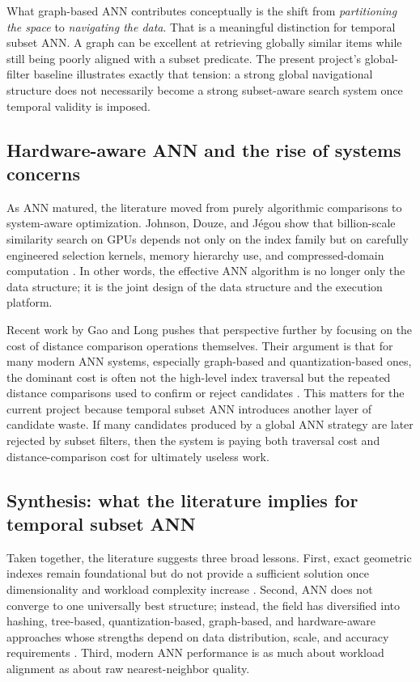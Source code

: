 \documentclass[sigconf,nonacm]{acmart}
\begin{document}
What graph-based ANN contributes conceptually is the shift from \emph{partitioning the space} to \emph{navigating the data}. That is a meaningful distinction for temporal subset ANN. A graph can be excellent at retrieving globally similar items while still being poorly aligned with a subset predicate. The present project's global-filter baseline illustrates exactly that tension: a strong global navigational structure does not necessarily become a strong subset-aware search system once temporal validity is imposed.

\subsection{Hardware-aware ANN and the rise of systems concerns}

As ANN matured, the literature moved from purely algorithmic comparisons to system-aware optimization. Johnson, Douze, and J\'egou show that billion-scale similarity search on GPUs depends not only on the index family but on carefully engineered selection kernels, memory hierarchy use, and compressed-domain computation \cite{johnson2021}. In other words, the effective ANN algorithm is no longer only the data structure; it is the joint design of the data structure and the execution platform.

Recent work by Gao and Long pushes that perspective further by focusing on the cost of distance comparison operations themselves. Their argument is that for many modern ANN systems, especially graph-based and quantization-based ones, the dominant cost is often not the high-level index traversal but the repeated distance comparisons used to confirm or reject candidates \cite{gao2023}. This matters for the current project because temporal subset ANN introduces another layer of candidate waste. If many candidates produced by a global ANN strategy are later rejected by subset filters, then the system is paying both traversal cost and distance-comparison cost for ultimately useless work.

\subsection{Synthesis: what the literature implies for temporal subset ANN}

Taken together, the literature suggests three broad lessons. First, exact geometric indexes remain foundational but do not provide a sufficient solution once dimensionality and workload complexity increase \cite{bentley1975,guttman1984,indyk1998}. Second, ANN does not converge to one universally best structure; instead, the field has diversified into hashing, tree-based, quantization-based, graph-based, and hardware-aware approaches whose strengths depend on data distribution, scale, and accuracy requirements \cite{andoni2018,muja2014,jegou2011,fu2019,malkov2020,johnson2021}. Third, modern ANN performance is as much about workload alignment as about raw nearest-neighbor quality.
\end{document}
